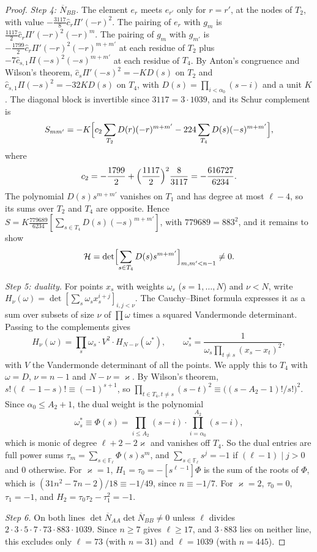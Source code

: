 \documentclass[11pt]{amsart}
\theoremstyle{definition}
\theoremstyle{remark}
\numberwithin{equation}{section}
\newcommand{\F}{\mathbb F}
\begin{document}
\begin{proof}
\emph{Step 4: $\overline N_{BB}$.} The element $e_r$ meets $e_{r'}$ only for $r=r'$, at the nodes of $T_2$, with value
$-\frac{3117}8\hat c_r\Pi'(-r)^2$. The pairing of $e_r$ with $g_m$ is $\frac{1117}2\hat c_r\Pi'(-r)^2(-r)^m$. The pairing of
$g_m$ with $g_{m'}$ is $-\frac{1799}2\hat c_r\Pi'(-r)^2(-r)^{m+m'}$ at each residue of $T_2$ plus
$-7\hat c_{s,1}\Pi(-s)^2(-s)^{m+m'}$ at each residue of $T_4$. By Anton's congruence \cite[Theorem~1]{Granville97} and Wilson's theorem,
$\hat c_s\Pi'(-s)^2=-KD(s)$ on $T_2$ and $\hat c_{s,1}\Pi(-s)^2=-32KD(s)$ on $T_4$, with $D(s)=\prod_{i<\alpha_0}(s-i)$ and a unit
$K$. The diagonal block is invertible since $3117=3\cdot1039$, and its Schur complement is
\[
 S_{mm'}=-K\Bigl[c_2\sum_{T_2}D(r)(-r)^{m+m'}-224\sum_{T_4}D(s)(-s)^{m+m'}\Bigr],
\]
where
\[
 c_2=-\frac{1799}2+\Bigl(\frac{1117}2\Bigr)^2\frac8{3117}=-\frac{616727}{6234}.
\]
The polynomial $D(s)s^{m+m'}$ vanishes on $T_1$ and has degree at most $\ell-4$, so its sums over $T_2$ and $T_4$ are
opposite. Hence $S=K\frac{779689}{6234}[\sum_{s\in T_4}D(s)(-s)^{m+m'}]$, with $779689=883^2$, and it remains to show
\[
 \mathcal H=\det\Bigl[\sum_{s\in T_4}D(s)s^{m+m'}\Bigr]_{m,m'<n-1}\ne0 .
\]

\emph{Step 5: duality.} For points $x_s$ with weights $\omega_s$ ($s=1,\dots,N$) and $\nu<N$, write
$H_{\nu}(\omega)=\det[\sum_s\omega_sx_s^{i+j}]_{i,j<\nu}$. The Cauchy--Binet formula expresses it as a
sum over subsets of size $\nu$ of $\prod\omega$ times a squared Vandermonde determinant. Passing to the
complements gives
\[
 H_{\nu}(\omega)=\prod_s\omega_s\cdot V^2\cdot H_{N-\nu}(\omega^*),\qquad
 \omega^*_s=\frac1{\omega_s\prod_{t\ne s}(x_s-x_t)^2},
\]
with $V$ the Vandermonde determinant of all the points. We apply this to $T_4$ with $\omega=D$, $\nu=n-1$ and
$N-\nu=\varkappa$. By Wilson's theorem, $s!(\ell-1-s)!\equiv(-1)^{s+1}$, so
$\prod_{t\in T_4,t\ne s}(s-t)^2\equiv\bigl((s-A_2-1)!/s!\bigr)^2$. Since $\alpha_0\le A_2+1$, the dual weight is the
polynomial
\[
 \omega^*_s\equiv\Phi(s)=\prod_{i\le A_2}(s-i)\cdot\prod_{i=\alpha_0}^{A_2}(s-i),
\]
which is monic of degree $\ell+2-2\varkappa$ and vanishes off $T_4$. So the dual entries are full power sums
$\tau_m=\sum_{s\in\F_\ell}\Phi(s)s^m$, and $\sum_{s\in\F_\ell}s^j=-1$ if $(\ell-1)\mid j>0$ and $0$ otherwise. For
$\varkappa=1$, $H_1=\tau_0=-[s^{\ell-1}]\Phi$ is the sum of the roots of $\Phi$, which is $(31n^2-7n-2)/18\equiv-1/49$,
since $n\equiv-1/7$. For $\varkappa=2$, $\tau_0=0$, $\tau_1=-1$, and $H_2=\tau_0\tau_2-\tau_1^2=-1$.

\emph{Step 6.} On both lines $\det\overline N_{AA}\det\overline N_{BB}\ne0$ unless $\ell$ divides
$2\cdot3\cdot5\cdot7\cdot73\cdot883\cdot1039$. Since $n\ge7$ gives $\ell\ge17$, and $3\cdot883$ lies on neither line, this
excludes only $\ell=73$ (with $n=31$) and $\ell=1039$ (with $n=445$).
\end{proof}
\end{document}
